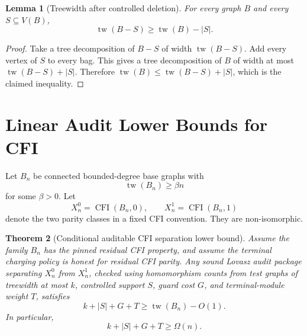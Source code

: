 \documentclass[11pt]{article}
\newtheorem{theorem}{Theorem}[section]
\newtheorem{lemma}[theorem]{Lemma}
\theoremstyle{definition}
\DeclareMathOperator{\CFI}{CFI}
\DeclareMathOperator{\tw}{tw}
\begin{document}
\begin{lemma}[Treewidth after controlled deletion]
For every graph \(B\) and every \(S\subseteq V(B)\),
\[
\tw(B-S)\geq \tw(B)-|S|.
\]
\end{lemma}

\begin{proof}
Take a tree decomposition of \(B-S\) of width \(\tw(B-S)\). Add every vertex of \(S\) to every bag. This gives a tree decomposition of \(B\) of width at most \(\tw(B-S)+|S|\). Therefore \(\tw(B)\leq \tw(B-S)+|S|\), which is the claimed inequality.
\end{proof}

\section{Linear Audit Lower Bounds for CFI}

Let \(B_n\) be connected bounded-degree base graphs with
\[
\tw(B_n)\geq \beta n
\]
for some \(\beta>0\). Let
\[
X_n^0=\CFI(B_n,0),
\qquad
X_n^1=\CFI(B_n,1)
\]
denote the two parity classes in a fixed CFI convention. They are non-isomorphic.

\begin{theorem}[Conditional auditable CFI separation lower bound]
Assume the family \(B_n\) has the pinned residual CFI property, and assume the terminal charging policy is honest for residual CFI parity. Any sound Lovasz audit package separating \(X_n^0\) from \(X_n^1\), checked using homomorphism counts from test graphs of treewidth at most \(k\), controlled support \(S\), guard cost \(G\), and terminal-module weight \(T\), satisfies
\[
k+|S|+G+T
\geq
\tw(B_n)-O(1).
\]
In particular,
\[
k+|S|+G+T\geq \Omega(n).
\]
\end{theorem}
\end{document}
